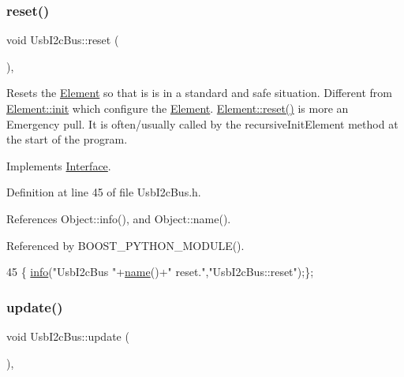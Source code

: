 \subsubsection{\texorpdfstring{reset()}{reset()}}
{\footnotesize\ttfamily void Usb\+I2c\+Bus\+::reset (\begin{DoxyParamCaption}{ }\end{DoxyParamCaption})\hspace{0.3cm}{\ttfamily [inline]}, {\ttfamily [virtual]}}

Resets the \hyperlink{classElement}{Element} so that is is in a standard and safe situation. Different from \hyperlink{classElement_af42754b5cabc198869222725218d695c}{Element\+::init} which configure the \hyperlink{classElement}{Element}. \hyperlink{classElement_a69efffa22f06909d768149715565cb56}{Element\+::reset()} is more an Emergency pull. It is often/usually called by the recursive\+Init\+Element method at the start of the program. 

Implements \hyperlink{classInterface_a4d44329cea9981a9e0392eaaf99efadd}{Interface}.



Definition at line 45 of file Usb\+I2c\+Bus.\+h.



References Object\+::info(), and Object\+::name().



Referenced by B\+O\+O\+S\+T\+\_\+\+P\+Y\+T\+H\+O\+N\+\_\+\+M\+O\+D\+U\+L\+E().


\begin{DoxyCode}
45 \{ \hyperlink{classObject_a644fd329ea4cb85f54fa6846484b84a8}{info}(\textcolor{stringliteral}{"UsbI2cBus "}+\hyperlink{classObject_a300f4c05dd468c7bb8b3c968868443c1}{name}()+\textcolor{stringliteral}{" reset."},\textcolor{stringliteral}{"UsbI2cBus::reset"});\};
\end{DoxyCode}
\mbox{\label{classUsbI2cBus_a40bd44e6fe19f3e9c52bd4b4e14b80a9}} 
\subsubsection{\texorpdfstring{update()}{update()}}
{\footnotesize\ttfamily void Usb\+I2c\+Bus\+::update (\begin{DoxyParamCaption}{ }\end{DoxyParamCaption})\hspace{0.3cm}{\ttfamily [inline]}, {\ttfamily [virtual]}}

